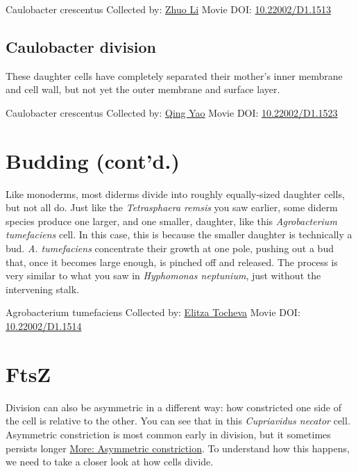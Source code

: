 \documentclass[]{tufte-book}
\begin{document}
\label{fig:5-7}Caulobacter crescentus Collected by: \protect\hyperlink{zhuo_li}{Zhuo Li} Movie DOI: \href{https://doi.org/10.22002/D1.1513}{10.22002/D1.1513}

\hypertarget{Caulobacter_division}{%
\subsection{Caulobacter division}\label{Caulobacter_division}}

These daughter cells have completely separated their mother's inner membrane and cell wall, but not yet the outer membrane and surface layer.



\hypertarget{htmlwidget-b990572670e403b7f3c7}{}

\label{fig:5-7a}Caulobacter crescentus Collected by: \protect\hyperlink{qing_yao}{Qing Yao} Movie DOI: \href{https://doi.org/10.22002/D1.1523}{10.22002/D1.1523}

\hypertarget{budding-contd.}{%
\section{Budding (cont'd.)}\label{budding-contd.}}

Like monoderms, most diderms divide into roughly equally-sized daughter cells, but not all do. Just like the \emph{Tetrasphaera remsis} you saw earlier, some diderm species produce one larger, and one smaller, daughter, like this \emph{Agrobacterium tumefaciens} cell. In this case, this is because the smaller daughter is technically a bud. \emph{A. tumefaciens} concentrate their growth at one pole, pushing out a bud that, once it becomes large enough, is pinched off and released. The process is very similar to what you saw in \emph{Hyphomonas neptunium}, just without the intervening stalk.



\hypertarget{htmlwidget-cadf2091c8bf88f6ee60}{}

\label{fig:5-8}Agrobacterium tumefaciens Collected by: \protect\hyperlink{elitza_tocheva}{Elitza Tocheva} Movie DOI: \href{https://doi.org/10.22002/D1.1514}{10.22002/D1.1514}

\hypertarget{ftsz}{%
\section{FtsZ}\label{ftsz}}

Division can also be asymmetric in a different way: how constricted one side of the cell is relative to the other. You can see that in this \emph{Cupriavidus necator} cell. Asymmetric constriction is most common early in division, but it sometimes persists longer \protect\hyperlink{Asymmetric_constriction}{More: Asymmetric constriction}. To understand how this happens, we need to take a closer look at how cells divide.
\end{document}
